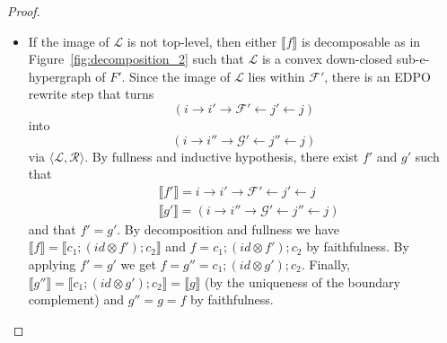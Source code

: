 \begin{proof}
\begin{itemize}
		\item If the image of $\mathcal{L}$ is not top-level, then either $\llbracket f \rrbracket$ is decomposable as in Figure~\ref{fig:decomposition_2}
		such that $\mathcal{L}$ is a convex down-closed sub-e-hypergraph of $F'$.
		Since the image of $\mathcal{L}$ lies within $\mathcal{F}'$, there is an EDPO rewrite step that turns
		\[
			(i \xrightarrow{} i' \xrightarrow{} \mathcal{F'} \xleftarrow{} j' \xleftarrow{} j)	
		\]
		into
		\[
			(i \xrightarrow{} i'' \xrightarrow{} \mathcal{G'} \xleftarrow{} j'' \xleftarrow{} j)	
		\]
		via $\langle \mathcal{L}, \mathcal{R} \rangle$.
		By fullness and inductive hypothesis, there exist $f'$ and $g'$ such that 
		\begin{align*}
			&\llbracket f' \rrbracket = i \xrightarrow{} i' \xrightarrow{} \mathcal{F'} \xleftarrow{} j' \xleftarrow{} j\\
            &\llbracket g' \rrbracket = (i \xrightarrow{} i'' \xrightarrow{} \mathcal{G'} \xleftarrow{} j'' \xleftarrow{} j)
        \end{align*}
		and that $f' = g'$.
		By decomposition and fullness we have $\llbracket f \rrbracket = \llbracket c_{1};(id \otimes f');c_{2} \rrbracket$ and $f = c_{1};(id \otimes f');c_{2}$ by faithfulness.
		By applying $f' = g'$ we get $f = g'' = c_{1};(id \otimes g');c_{2}$.
		Finally, $\llbracket g'' \rrbracket = \llbracket c_{1};(id \otimes g');c_{2} \rrbracket = \llbracket g \rrbracket$ (by the uniqueness of the boundary complement) and $g'' = g = f$ by faithfulness.


\end{itemize}
\end{proof}

